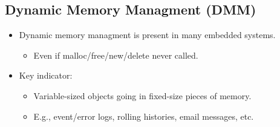 \subsection{Dynamic Memory Managment (DMM)}
\begin{itemize}
  \item Dynamic memory managment is present in many embedded systems.
  \begin{itemize}
    \item Even if malloc/free/new/delete never called.
  \end{itemize}
  \item Key indicator:
  \begin{itemize}
    \item Variable-sized objects going in fixed-size pieces of memory.
    \item E.g., event/error logs, rolling histories, email messages, etc.
  \end{itemize}
\end{itemize}

